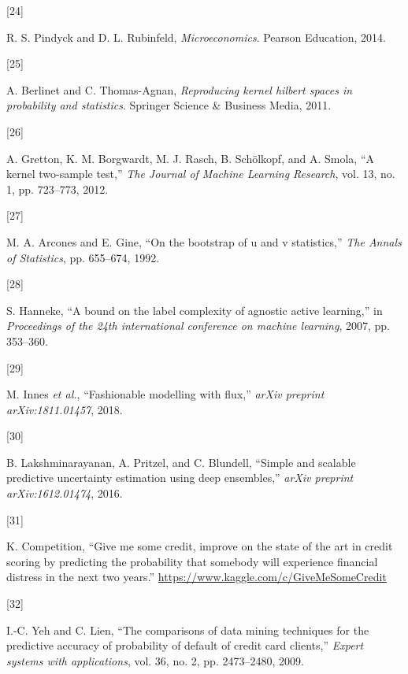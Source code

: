 \documentclass[
  conference]{IEEEtran}
\newlength{\cslhangindent}
\newlength{\csllabelwidth}
\newlength{\cslentryspacingunit} %
\newenvironment{CSLReferences}[2] %
 {%
  \setlength{\parindent}{0pt}
  \ifodd #1
  \let\oldpar\par
  \def\par{\hangindent=\cslhangindent\oldpar}
  \fi
  \setlength{\parskip}{#2\cslentryspacingunit}
 }%
 {}
\newcommand{\CSLLeftMargin}[1]{\parbox[t]{\csllabelwidth}{#1}}
\newcommand{\CSLRightInline}[1]{\parbox[t]{\linewidth - \csllabelwidth}{#1}\break}
\begin{document}
\begin{CSLReferences}{0}{0}
\leavevmode{}%
\CSLLeftMargin{{[}24{]} }%
\CSLRightInline{R. S. Pindyck and D. L. Rubinfeld,
\emph{Microeconomics}. Pearson Education, 2014.}

\leavevmode{}%
\CSLLeftMargin{{[}25{]} }%
\CSLRightInline{A. Berlinet and C. Thomas-Agnan, \emph{Reproducing
kernel hilbert spaces in probability and statistics}. Springer Science
\& Business Media, 2011.}

\leavevmode{}%
\CSLLeftMargin{{[}26{]} }%
\CSLRightInline{A. Gretton, K. M. Borgwardt, M. J. Rasch, B. Schölkopf,
and A. Smola, {``A kernel two-sample test,''} \emph{The Journal of
Machine Learning Research}, vol. 13, no. 1, pp. 723--773, 2012.}

\leavevmode{}%
\CSLLeftMargin{{[}27{]} }%
\CSLRightInline{M. A. Arcones and E. Gine, {``On the bootstrap of u and
v statistics,''} \emph{The Annals of Statistics}, pp. 655--674, 1992.}

\leavevmode{}%
\CSLLeftMargin{{[}28{]} }%
\CSLRightInline{S. Hanneke, {``A bound on the label complexity of
agnostic active learning,''} in \emph{Proceedings of the 24th
international conference on machine learning}, 2007, pp. 353--360.}

\leavevmode{}%
\CSLLeftMargin{{[}29{]} }%
\CSLRightInline{M. Innes \emph{et al.}, {``Fashionable modelling with
flux,''} \emph{arXiv preprint arXiv:1811.01457}, 2018.}

\leavevmode{}%
\CSLLeftMargin{{[}30{]} }%
\CSLRightInline{B. Lakshminarayanan, A. Pritzel, and C. Blundell,
{``Simple and scalable predictive uncertainty estimation using deep
ensembles,''} \emph{arXiv preprint arXiv:1612.01474}, 2016.}

\leavevmode{}%
\CSLLeftMargin{{[}31{]} }%
\CSLRightInline{K. Competition, {``Give me some credit, improve on the
state of the art in credit scoring by predicting the probability that
somebody will experience financial distress in the next two years.''}
\url{https://www.kaggle.com/c/GiveMeSomeCredit}}

\leavevmode{}%
\CSLLeftMargin{{[}32{]} }%
\CSLRightInline{I.-C. Yeh and C. Lien, {``The comparisons of data mining
techniques for the predictive accuracy of probability of default of
credit card clients,''} \emph{Expert systems with applications}, vol.
36, no. 2, pp. 2473--2480, 2009.}


\end{CSLReferences}
\end{document}
